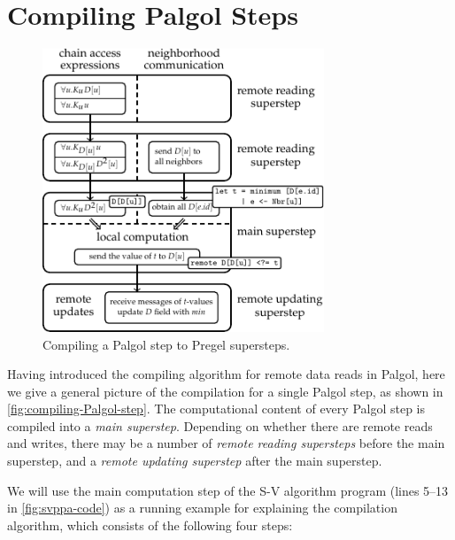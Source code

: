 \documentclass{sokendai_thesis} %
\begin{document}
\section{Compiling Palgol Steps}
\label{sec:trans-step}

\begin{figure}
 \centering
 \includegraphics[width=0.75\textwidth]{figures/compile.pdf}
 \caption{Compiling a Palgol step to Pregel supersteps.}
 \label{fig:compiling-Palgol-step}
\vspace{-2ex}\end{figure}

Having introduced the compiling algorithm for remote data reads in Palgol, here we give a general picture of the compilation for a single Palgol step, as shown in \autoref{fig:compiling-Palgol-step}.
The computational content of every Palgol step is compiled into a \emph{main superstep}.
Depending on whether there are remote reads and writes, there may be a number of \emph{remote reading supersteps} before the main superstep, and a \emph{remote updating superstep} after the main superstep.

We will use the main computation step of the S-V algorithm program (lines 5--13 in \autoref{fig:svppa-code}) as a running example for explaining the compilation algorithm, which consists of the following four steps:
\end{document}
